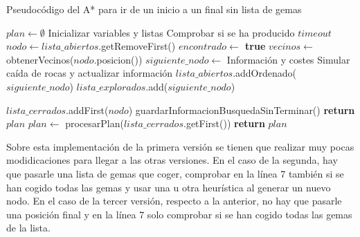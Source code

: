 \documentclass[11pt,a4paper]{article}
\begin{document}
\begin{algorithm}[H]
\caption{Pseudocódigo del A* para ir de un inicio a un final sin lista de gemas}
\begin{algorithmic}[1]
\State $plan \gets \emptyset$
\State Inicializar variables y listas
	\State Comprobar si se ha producido $timeout$
	\State $nodo \gets lista\_abiertos$.getRemoveFirst()
		\State \textbf{$encontrado \gets $ true}
	\Else
		\State $vecinos \gets $ obtenerVecinos($nodo$.posicion())
				\State $siguiente\_nodo \gets$ Información y costes
					\State Simular caída de rocas y actualizar información
				\EndIf
					\State $lista\_abiertos$.addOrdenado($siguiente\_nodo$)
					\State $lista\_explorados$.add($siguiente\_nodo$)
				\EndIf{}
			\EndIf{}
		\EndFor
	\EndIf
	
	\State $lista\_cerrados$.addFirst($nodo$)
\EndWhile
{}
	\State guardarInformacionBusquedaSinTerminar()
	\State \textbf{return} $plan$
\EndIf
{}
	\State $plan \gets$ procesarPlan($lista\_cerrados$.getFirst())
\EndIf
\State \textbf{return} $plan$
\EndProcedure
\end{algorithmic}
\end{algorithm}

Sobre esta implementación de la primera versión se tienen que realizar muy pocas modidicaciones para
llegar a las otras versiones. En el caso de la segunda, hay que pasarle una lista de gemas que coger,
comprobar en la línea 7 también si se han cogido todas las gemas y usar una u otra heurística al generar
un nuevo nodo. En el caso de la tercer versión, respecto a la anterior, no hay que pasarle una posición
final y en la línea 7 solo comprobar si se han cogido todas las gemas de la lista.
\end{document}
